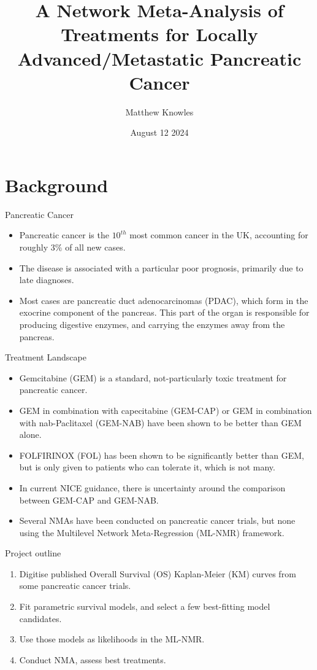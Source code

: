 \documentclass{beamer}
\title{A Network Meta-Analysis of Treatments for Locally Advanced/Metastatic Pancreatic Cancer}
\author{Matthew Knowles}
\institute{University of Sheffield}
\date{August 12 2024}
\begin{document}
\begin{frame}
    \titlepage
\end{frame} 

\section{Background}

\begin{frame}{Pancreatic Cancer}
    \begin{itemize}
        \item Pancreatic cancer is the $10^{th}$ most common cancer in the UK, accounting for roughly $3\%$ of all new cases. 
        \item The disease is associated with a particular poor prognosis, primarily due to late diagnoses.
        \item Most cases are pancreatic duct  adenocarcinomas (PDAC), which form in the exocrine component of the pancreas. This part of the organ is responsible for producing digestive enzymes, and carrying the enzymes away from the pancreas. 
    \end{itemize}
\end{frame}

\begin{frame}{Treatment Landscape}
    \begin{itemize}
        \item Gemcitabine (GEM) is a standard, not-particularly toxic treatment for pancreatic cancer.
        \item GEM in combination with capecitabine (GEM-CAP) or GEM in combination with nab-Paclitaxel (GEM-NAB) have been shown to be better than GEM alone.
        \item FOLFIRINOX (FOL) has been shown to be significantly better than GEM, but is only given to patients who can tolerate it, which is not many. 
        \item In current NICE guidance, there is uncertainty around the comparison between GEM-CAP and GEM-NAB.
        \item Several NMAs have been conducted on pancreatic cancer trials, but none using the Multilevel Network Meta-Regression (ML-NMR) framework.
    \end{itemize} 
\end{frame}

\begin{frame}{Project outline}
    \begin{enumerate}
        \item Digitise published Overall Survival (OS) Kaplan-Meier (KM) curves from some pancreatic cancer trials.
        \pause
        \item Fit parametric survival models, and select a few best-fitting model candidates.
        \pause
        \item Use those models as likelihoods in the ML-NMR.
        \pause
        \item Conduct NMA, assess best treatments.
    \end{enumerate} 
\end{frame} 
\end{document}
